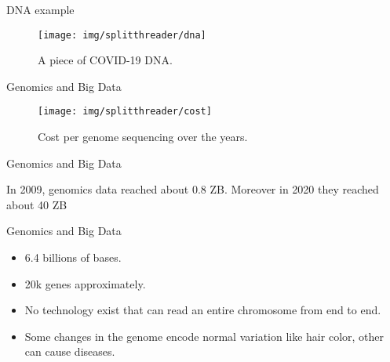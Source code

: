 \documentclass[10pt]{beamer}
\newcommand{\1}{
        	\setbeamertemplate{background}{
        		\texttt{[image: img/1\_BIO]}
        		\tikz[overlay] \fill[fill opacity=0.75,fill=white] (0,0) rectangle (-\paperwidth,\paperheight);
        	}
}
\begin{document}
\begin{frame}{DNA example}{}
	\begin{figure}[H]
		\centering
		\texttt{[image: img/splitthreader/dna]}
		\caption{A piece of COVID-19 DNA.}
		\label{fig:dna}
	\end{figure}
\end{frame}

\begin{frame}{Genomics and Big Data}{}	
	\begin{figure}
		\centering
		\texttt{[image: img/splitthreader/cost]}
		\caption{Cost per genome sequencing over the years.}
	\end{figure}		
\end{frame}

\begin{frame}{Genomics and Big Data}{}	
	\begin{block}{}
		In 2009, genomics data reached about 0.8 ZB. Moreover in 2020 they reached about 40 ZB \cite{prabahar2016perspectives}
	\end{block}		
\end{frame}

\begin{frame}{Genomics and Big Data}{}
	\begin{itemize}
		\item 6.4 billions of bases.
		\item 20k genes approximately.
		\item No technology exist that can read an entire chromosome from end to end.
		\item Some changes in the genome encode normal variation like hair color, other can cause diseases.
	\end{itemize}		
\end{frame}
\end{document}
